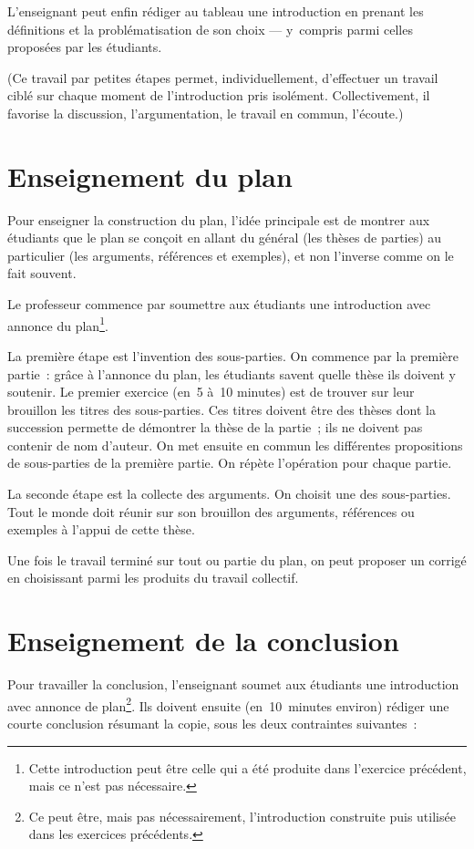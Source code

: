 \documentclass[a4paper,12pt]{report}
\begin{document}
L'enseignant peut enfin rédiger au tableau une introduction en prenant
les définitions et la problématisation de son choix — y compris parmi
celles proposées par les étudiants.

(Ce travail par petites étapes permet, individuellement, d'effectuer un
travail ciblé sur chaque moment de l'introduction pris isolément.
Collectivement, il favorise la discussion, l'argumentation, le travail
en commun, l'écoute.)


\chapter{Enseignement du plan}
\label{sec:org24d5667}

Pour enseigner la construction du plan, l'idée principale est de montrer
aux étudiants que le plan se conçoit en allant du général (les thèses de
parties) au particulier (les arguments, références et exemples), et non
l'inverse comme on le fait souvent.

Le professeur commence par soumettre aux étudiants une introduction avec
annonce du plan\footnote{Cette introduction peut être celle qui a été produite dans
l'exercice précédent, mais ce n'est pas nécessaire.}.

La première étape est l'invention des sous-parties. On commence par la
première partie : grâce à l'annonce du plan, les étudiants savent quelle
thèse ils doivent y soutenir. Le premier exercice (en 5 à 10 minutes)
est de trouver sur leur brouillon les titres des sous-parties. Ces
titres doivent être des thèses dont la succession permette de démontrer
la thèse de la partie ; ils ne doivent pas contenir de nom d'auteur. On
met ensuite en commun les différentes propositions de sous-parties de la
première partie. On répète l'opération pour chaque partie.

La seconde étape est la collecte des arguments. On choisit une des
sous-parties. Tout le monde doit réunir sur son brouillon des arguments,
références ou exemples à l'appui de cette thèse.

Une fois le travail terminé sur tout ou partie du plan, on peut proposer
un corrigé en choisissant parmi les produits du travail collectif.


\chapter{Enseignement de la conclusion}
\label{sec:orgc8ef23e}

Pour travailler la conclusion, l'enseignant soumet aux étudiants une
introduction avec annonce de plan\footnote{Ce peut être, mais pas nécessairement, l'introduction construite
puis utilisée dans les exercices précédents.}. Ils doivent ensuite
(en 10 minutes environ) rédiger une courte conclusion résumant la copie,
sous les deux contraintes suivantes :
\end{document}
